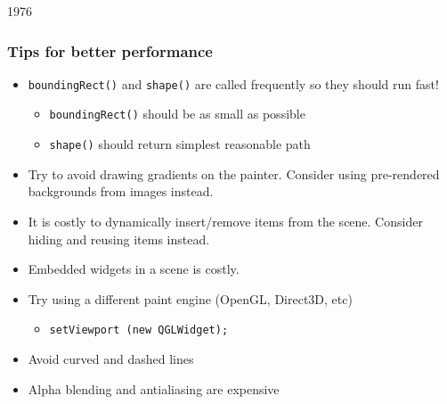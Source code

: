 \begin{slide}{1976}

\frametitle{Tips for better performance}
\begin{itemize}
   \item \texttt{boundingRect()} and \texttt{shape()} are called frequently so they should run fast!
        \begin{itemize}
            \item \texttt{boundingRect()} should be as small as possible
            \item \texttt{shape()} should return simplest reasonable path
        \end{itemize}
   \item Try to avoid drawing gradients on the painter. Consider using pre-rendered backgrounds from images instead.
   \item It is costly to dynamically insert/remove items from the scene.  Consider hiding and reusing items instead. 
   \item Embedded widgets in a scene is costly.
   \item Try using a different paint engine (OpenGL, Direct3D, etc)
        \begin{itemize}
        \item \texttt{setViewport (new QGLWidget);}
        \end{itemize}
   \item Avoid curved and dashed lines
   \item Alpha blending and antialiasing are expensive

   
\end{itemize} 
\end{slide}

   
  
